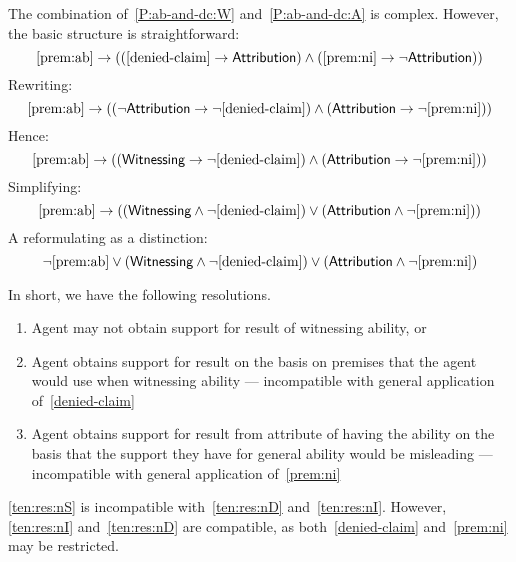 \begin{note}
  The combination of~\ref{P:ab-and-dc:W} and~\ref{P:ab-and-dc:A} is complex.
  However, the basic structure is straightforward:
  \[\ref{prem:ab} \rightarrow ((\ref{denied-claim} \rightarrow \textsf{Attribution}{}) \land (\ref{prem:ni} \rightarrow \lnot \textsf{Attribution}{}))\]
  Rewriting:
  \[\ref{prem:ab} \rightarrow ((\lnot \textsf{Attribution}{} \rightarrow \lnot \ref{denied-claim}) \land (\textsf{Attribution}{} \rightarrow \lnot \ref{prem:ni}))\]
  Hence:
    \[\ref{prem:ab} \rightarrow ((\textsf{Witnessing}{} \rightarrow \lnot \ref{denied-claim}) \land (\textsf{Attribution}{} \rightarrow \lnot \ref{prem:ni}))\]
  Simplifying:
  \[\ref{prem:ab} \rightarrow ((\textsf{Witnessing}{} \land \lnot \ref{denied-claim}) \lor (\textsf{Attribution}{} \land \lnot \ref{prem:ni}))\]
  A reformulating as a distinction:
  \[\lnot \ref{prem:ab} \lor (\textsf{Witnessing}{} \land \lnot \ref{denied-claim}) \lor (\textsf{Attribution}{} \land\lnot \ref{prem:ni})\]

  In short, we have the following resolutions.
  \begin{enumerate}
  \item\label{ten:res:nS} Agent may not obtain support for result of witnessing ability, or
  \item\label{ten:res:nD} Agent obtains support for result on the basis on premises that the agent would use when witnessing ability --- incompatible with general application of~\ref{denied-claim}
  \item\label{ten:res:nI} Agent obtains support for result from attribute of having the ability on the basis that the support they have for general ability would be misleading --- incompatible with general application of~\ref{prem:ni}
  \end{enumerate}
  \ref{ten:res:nS} is incompatible with~\ref{ten:res:nD} and~\ref{ten:res:nI}.
  However, \ref{ten:res:nI} and~\ref{ten:res:nD} are compatible, as both~\ref{denied-claim} and~\ref{prem:ni} may be restricted.
\end{note}

